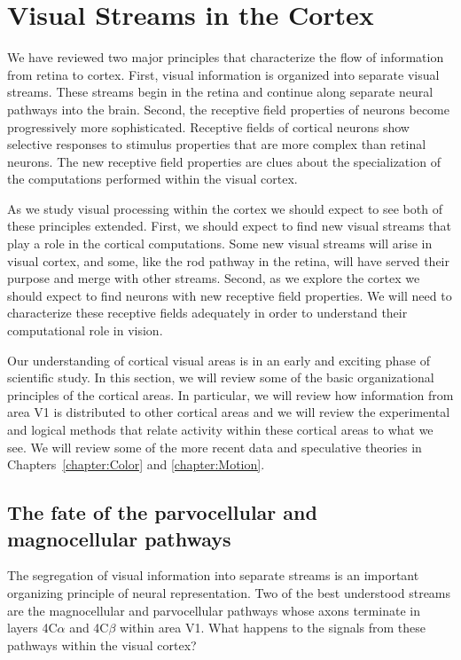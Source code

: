 \section{Visual Streams in the Cortex}

We have reviewed two major principles that characterize
the flow of information from retina to cortex.
First, visual information is organized into separate
visual streams.
These streams begin in the retina and continue
along separate neural pathways into the brain.
Second, 
the receptive field properties of
neurons become progressively more sophisticated.
Receptive fields of
cortical neurons show selective responses
to stimulus properties that are more complex than
retinal neurons.
The new receptive field properties are clues
about the specialization of the
computations performed within the visual cortex.

As we study visual processing within the cortex
we should expect to see both of these principles extended.
First, we should expect to find
new visual streams that play a role in the cortical
computations.
Some new visual streams will arise in visual cortex,
and some, like the rod pathway in the retina,
will have served their purpose and merge with other streams.
Second, as we explore the cortex
we should expect to find neurons
with new receptive field properties.
We will need to characterize these receptive fields
adequately in order to understand their computational
role in vision.

Our understanding of cortical visual areas is in 
an early and exciting phase of scientific study.
In this section, we will review some of the basic
organizational principles of the cortical areas.
In particular, we will review how information from
area V1 is distributed to other cortical areas
and we will review the experimental and logical methods
that relate activity
within these cortical areas to what we see.
We will review some of the more
recent data and speculative theories
in Chapters~\ref{chapter:Color} and \ref{chapter:Motion}.

\subsection*{The fate of the parvocellular and magnocellular pathways}
The segregation of visual information into separate streams
is an important organizing principle of neural representation.
Two of the best understood streams
are the magnocellular and parvocellular
pathways whose axons terminate in layers 4C$\alpha$ and 4C$\beta$
within area V1.
What happens to the signals from these pathways within the visual cortex?

